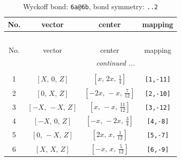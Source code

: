 \documentclass[fleqn,8pt]{jsarticle}
\begin{document}
\renewcommand{\arraystretch}{1.2}
\begin{longtable}{cccc}
\caption{Wyckoff bond: {\tt 6a@6b}, bond symmetry: {\tt ..2}}
 \\
 \hline \hline
No. & vector & center & mapping \\ \hline \endfirsthead

\multicolumn{3}{l}{\tablename\ \thetable{}} \\
 \hline \hline
No. & vector & center & mapping \\ \hline \endhead

 \hline \hline
\multicolumn{3}{r}{\footnotesize\it continued ...} \\ \endfoot

 \hline \hline
\multicolumn{3}{r}{} \\ \endlastfoot

1 & $\left[ X,\, 0,\, Z \right]$ & $\left[ x,\, 2 x,\, \frac{1}{4} \right]$ & {\tt [1,-11]} \\ \hline
2 & $\left[ 0,\, X,\, Z \right]$ & $\left[ - 2 x,\, - x,\, \frac{7}{12} \right]$ & {\tt [2,-10]} \\ \hline
3 & $\left[ - X,\, - X,\, Z \right]$ & $\left[ x,\, - x,\, \frac{11}{12} \right]$ & {\tt [3,-12]} \\ \hline
4 & $\left[ - X,\, 0,\, Z \right]$ & $\left[ - x,\, - 2 x,\, \frac{3}{4} \right]$ & {\tt [4,-8]} \\ \hline
5 & $\left[ 0,\, - X,\, Z \right]$ & $\left[ 2 x,\, x,\, \frac{1}{12} \right]$ & {\tt [5,-7]} \\ \hline
6 & $\left[ X,\, X,\, Z \right]$ & $\left[ - x,\, x,\, \frac{5}{12} \right]$ & {\tt [6,-9]} \\
\end{longtable}
\renewcommand{\arraystretch}{1.2}
\end{document}
